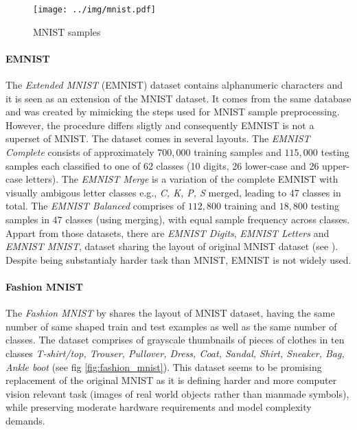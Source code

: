 \begin{figure}
    \centering
    \texttt{[image: ../img/mnist.pdf]}
    \caption{MNIST samples}
    \label{fig:mnist}
\end{figure}

\paragraph{EMNIST}

The \emph{Extended MNIST} (EMNIST) dataset contains alphanumeric characters and it is seen as an extension of the MNIST dataset. It comes from the same database and was created by mimicking the steps used for MNIST sample preprocessing. However, the procedure differs sligtly and consequently EMNIST is not a superset of MNIST. The dataset comes in several layouts. The \emph{EMNIST Complete} consists of approximately $700,000$ training samples and $115,000$ testing samples each classified to one of 62 classes (10 digits, 26 lower-case and 26 upper-case letters). The \emph{EMNIST Merge} is a variation of the complete EMNIST with visually ambigous letter classes e.g., \emph{C, K, P, S} merged, leading to 47 classes in total. The \emph{EMNIST Balanced} comprises of $112,800$ training and $18,800$ testing samples in 47 classes (using merging), with equal sample frequency across classes. Appart from those datasets, there are \emph{EMNIST Digits}, \emph{EMNIST Letters} and \emph{EMNIST MNIST}, dataset sharing the layout of original MNIST dataset (see \cite{DBLP:journals/corr/CohenATS17}). Despite being substantialy harder task than MNIST, EMNIST is not widely used.

\paragraph{Fashion MNIST}

The \emph{Fashion MNIST} by \cite{DBLP:journals/corr/abs-1708-07747} shares the layout of MNIST dataset, having the same number of same shaped train and test examples as well as the same number of classes. The dataset comprises of grayscale thumbnails of pieces of clothes in ten classes \emph{T-shirt/top, Trouser, Pullover, Dress, Coat, Sandal, Shirt, Sneaker, Bag, Ankle boot} (see fig \ref{fig:fashion_mnist}). This dataset seems to be promising replacement of the original MNIST as it is defining harder and more computer vision relevant task (images of real world objects rather than manmade symbols), while preserving moderate hardware requirements and model complexity demands.

